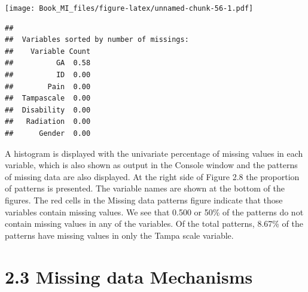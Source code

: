 \documentclass[]{book}
\begin{document}
\texttt{[image: Book\_MI\_files/figure-latex/unnamed-chunk-56-1.pdf]}

\begin{verbatim}
## 
##  Variables sorted by number of missings: 
##    Variable Count
##          GA  0.58
##          ID  0.00
##        Pain  0.00
##  Tampascale  0.00
##  Disability  0.00
##   Radiation  0.00
##      Gender  0.00
\end{verbatim}

A histogram is displayed with the univariate percentage of missing
values in each variable, which is also shown as output in the Console
window and the patterns of missing data are also displayed. At the right
side of Figure 2.8 the proportion of patterns is presented. The variable
names are shown at the bottom of the figures. The red cells in the
Missing data patterns figure indicate that those variables contain
missing values. We see that 0.500 or 50\% of the patterns do not contain
missing values in any of the variables. Of the total patterns, 8.67\% of
the patterns have missing values in only the Tampa scale variable.

\section{2.3 Missing data Mechanisms}\label{missing-data-mechanisms}
\end{document}
